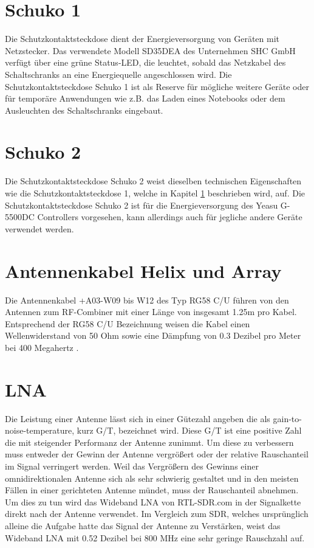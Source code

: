 \section{Schuko 1}
\label{sec:schuko1}
Die Schutzkontaktsteckdose dient der Energieversorgung von Geräten mit Netzstecker. Das verwendete Modell SD35DEA des Unternehmen SHC GmbH verfügt über eine grüne Status-LED, die leuchtet, sobald das Netzkabel des Schaltschranks an eine Energiequelle angeschlossen wird. Die Schutzkontaktsteckdose Schuko 1 ist als Reserve für mögliche weitere Geräte oder für temporäre Anwendungen wie z.B. das Laden eines Notebooks oder dem Ausleuchten des Schaltschranks eingebaut.

\section{Schuko 2}
\label{sec:schuko2}
Die Schutzkontaktsteckdose Schuko 2 weist dieselben technischen Eigenschaften wie die Schutzkontaktsteckdose 1, welche in Kapitel \ref{sec:schuko1} beschrieben wird, auf. Die Schutzkontaktsteckdose Schuko 2 ist für die Energieversorgung des Yeasu G-5500DC Controllers vorgesehen, kann allerdings auch für jegliche andere Geräte verwendet werden.

\section{Antennenkabel Helix und Array}
\label{sec:Antennenkabel-Helix}
Die Antennenkabel +A03-W09 bis W12 des Typ RG58 C/U führen von den Antennen zum RF-Combiner mit einer Länge von insgesamt 1.25m pro Kabel. Entsprechend der RG58 C/U Bezeichnung weisen die Kabel einen Wellenwiderstand von 50 Ohm sowie \cite{noauthor_rg_nodate} eine Dämpfung von 0.3 Dezibel pro Meter bei 400 Megahertz \cite{noauthor_vergleich_nodate}. 

\section{LNA}
\label{sec:LNA}
Die Leistung einer Antenne lässt sich in einer Gütezahl angeben die als gain-to-noise-temperature, kurz G/T, bezeichnet wird. Diese G/T ist eine positive Zahl die mit steigender Performanz der Antenne zunimmt. Um diese zu verbessern muss entweder der Gewinn der Antenne vergrößert oder der relative Rauschanteil im Signal verringert werden. Weil das Vergrößern des Gewinns einer omnidirektionalen Antenne sich als sehr schwierig gestaltet und in den meisten Fällen in einer gerichteten Antenne mündet, muss der Rauschanteil abnehmen. Um dies zu tun wird das Wideband LNA von RTL-SDR.com in der Signalkette direkt nach der Antenne verwendet. Im Vergleich zum SDR, welches ursprünglich alleine die Aufgabe hatte das Signal der Antenne zu Verstärken, weist das Wideband LNA mit 0.52 Dezibel bei 800 MHz eine sehr geringe Rauschzahl auf. \cite{noauthor_new_nodate} \cite{noauthor_omnidirectional_nodate}

